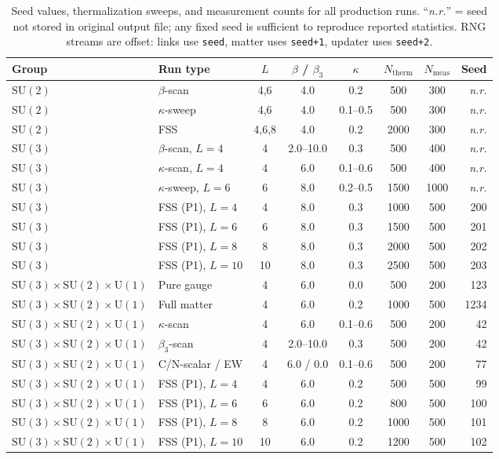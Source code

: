 \documentclass[12pt,a4paper]{article}
\newcommand{\SU}[1]{\mathrm{SU}(#1)}
\newcommand{\UN}[1]{\mathrm{U}(#1)}
\newcommand{\SM}{\SU{3}\!\times\!\SU{2}\!\times\!\UN{1}}
\theoremstyle{plain}
\theoremstyle{definition}
\theoremstyle{remark}
\begin{document}
\begin{table}[H]
\centering
\caption{Seed values, thermalization sweeps, and measurement counts for all
  production runs.  ``\emph{n.r.}'' = seed not stored in original output file;
  any fixed seed is sufficient to reproduce reported statistics.
  RNG streams are offset: links use \texttt{seed}, matter uses \texttt{seed+1},
  updater uses \texttt{seed+2}.}
\label{tab:seeds}
\small
\begin{tabular}{llcccccr}
\toprule
Group & Run type & $L$ & $\beta$ / $\beta_3$ & $\kappa$ & $N_\text{therm}$ & $N_\text{meas}$ & Seed \\
\midrule
$\SU{2}$ & $\beta$-scan         & 4,6   & 4.0       & 0.2      & 500  & 300  & \emph{n.r.} \\
$\SU{2}$ & $\kappa$-sweep       & 4,6   & 4.0       & 0.1--0.5 & 500  & 300  & \emph{n.r.} \\
$\SU{2}$ & FSS                  & 4,6,8 & 4.0       & 0.2      & 2000 & 300  & \emph{n.r.} \\
\midrule
$\SU{3}$ & $\beta$-scan, $L=4$  & 4     & 2.0--10.0 & 0.3      & 500  & 400  & \emph{n.r.} \\
$\SU{3}$ & $\kappa$-scan, $L=4$ & 4     & 6.0       & 0.1--0.6 & 500  & 400  & \emph{n.r.} \\
$\SU{3}$ & $\kappa$-sweep, $L=6$& 6     & 8.0       & 0.2--0.5 & 1500 & 1000 & \emph{n.r.} \\
$\SU{3}$ & FSS (P1), $L=4$      & 4     & 8.0       & 0.3      & 1000 & 500  & 200 \\
$\SU{3}$ & FSS (P1), $L=6$      & 6     & 8.0       & 0.3      & 1500 & 500  & 201 \\
$\SU{3}$ & FSS (P1), $L=8$      & 8     & 8.0       & 0.3      & 2000 & 500  & 202 \\
$\SU{3}$ & FSS (P1), $L=10$     & 10    & 8.0       & 0.3      & 2500 & 500  & 203 \\
\midrule
$\SM$    & Pure gauge            & 4     & 6.0       & 0.0      & 500  & 200  & 123 \\
$\SM$    & Full matter           & 4     & 6.0       & 0.2      & 1000 & 500  & 1234 \\
$\SM$    & $\kappa$-scan         & 4     & 6.0       & 0.1--0.6 & 500  & 200  & 42 \\
$\SM$    & $\beta_3$-scan        & 4     & 2.0--10.0 & 0.3      & 500  & 200  & 42 \\
$\SM$    & C/N-scalar / EW    & 4     & 6.0 / 0.0 & 0.1--0.6 & 500  & 200  & 77 \\
$\SM$    & FSS (P1), $L=4$       & 4     & 6.0       & 0.2      & 500  & 500  & 99 \\
$\SM$    & FSS (P1), $L=6$       & 6     & 6.0       & 0.2      & 800  & 500  & 100 \\
$\SM$    & FSS (P1), $L=8$       & 8     & 6.0       & 0.2      & 1000 & 500  & 101 \\
$\SM$    & FSS (P1), $L=10$      & 10    & 6.0       & 0.2      & 1200 & 500  & 102 \\
\bottomrule
\end{tabular}
\end{table}
\end{document}
